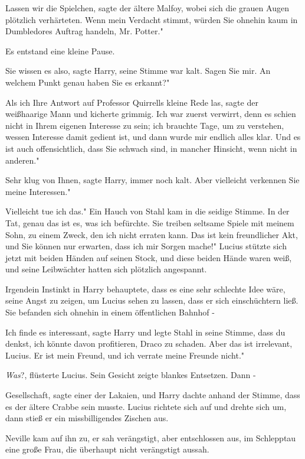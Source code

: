 \glqq Lassen wir die Spielchen\grqq{}, sagte der ältere Malfoy, wobei sich die
grauen Augen plötzlich verhärteten. \glqq Wenn mein Verdacht stimmt, würden Sie
ohnehin kaum in Dumbledores Auftrag handeln, Mr. Potter."

Es entstand eine kleine Pause.

\glqq Sie wissen es also\grqq{}, sagte Harry, seine Stimme war kalt. \glqq Sagen
Sie mir. An welchem Punkt genau haben Sie es erkannt?"

\glqq Als ich Ihre Antwort auf Professor Quirrells kleine Rede las\grqq{}, sagte
der weißhaarige Mann und kicherte grimmig. \glqq Ich war zuerst verwirrt, denn
es schien nicht in Ihrem eigenen Interesse zu sein; ich brauchte Tage, um zu
verstehen, wessen Interesse damit gedient ist, und dann wurde mir endlich alles
klar. Und es ist auch offensichtlich, dass Sie schwach sind, in mancher
Hinsicht, wenn nicht in anderen."

\glqq Sehr klug von Ihnen\grqq{}, sagte Harry, immer noch kalt. \glqq Aber
vielleicht verkennen Sie meine Interessen."

\glqq Vielleicht tue ich das." Ein Hauch von Stahl kam in die seidige Stimme.
\glqq In der Tat, genau das ist es, was ich befürchte. Sie treiben seltsame
Spiele mit meinem Sohn, zu einem Zweck, den ich nicht erraten kann. Das ist kein
freundlicher Akt, und Sie können nur erwarten, dass ich mir Sorgen mache!"
Lucius stützte sich jetzt mit beiden Händen auf seinen Stock, und diese beiden
Hände waren weiß, und seine Leibwächter hatten sich plötzlich angespannt.

Irgendein Instinkt in Harry behauptete, dass es eine sehr schlechte Idee wäre,
seine Angst zu zeigen, um Lucius sehen zu lassen, dass er sich einschüchtern
ließ. Sie befanden sich ohnehin in einem öffentlichen Bahnhof -

\glqq Ich finde es interessant\grqq{}, sagte Harry und legte Stahl in seine
Stimme, \glqq dass du denkst, ich könnte davon profitieren, Draco zu schaden.
Aber das ist irrelevant, Lucius. Er ist mein Freund, und ich verrate meine
Freunde nicht."

\glqq \emph{Was}?\grqq{}, flüsterte Lucius. Sein Gesicht zeigte blankes
Entsetzen. Dann -

\glqq Gesellschaft\grqq{}, sagte einer der Lakaien, und Harry dachte anhand der
Stimme, dass es der ältere Crabbe sein musste. Lucius richtete sich auf und
drehte sich um, dann stieß er ein missbilligendes Zischen aus.

Neville kam auf ihn zu, er sah verängstigt, aber entschlossen aus, im Schlepptau
eine große Frau, die überhaupt nicht verängstigt aussah.

